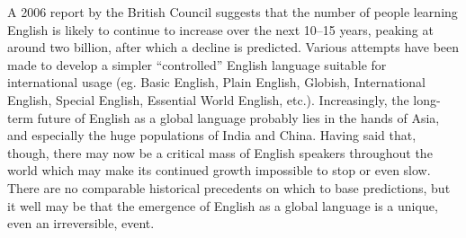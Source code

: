 \documentclass[../main.tex]{subfiles}
\begin{document}
        A 2006 report by the British Council suggests that the number of people learning English is likely to continue to increase over the next 10--15 years, peaking at around two billion, after which a decline is predicted. Various attempts have been made to develop a simpler ``controlled'' English language suitable for international usage (eg. Basic English, Plain English, Globish, International English, Special English, Essential World English, etc.). Increasingly, the long-term future of English as a global language probably lies in the hands of Asia, and especially the huge populations of India and China. Having said that, though, there may now be a critical mass of English speakers throughout the world which may make its continued growth impossible to stop or even slow. There are no comparable historical precedents on which to base predictions, but it well may be that the emergence of English as a global language is a unique, even an irreversible, event.
\end{document}
